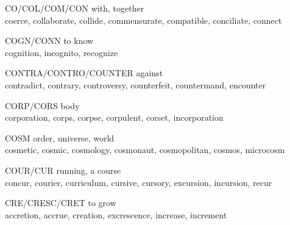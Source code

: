 \begin{flashcard}[Roots]{CO/COL/COM/CON}
with, together\\
\vspace{0.2in}
 coerce, collaborate, collide, commensurate, compatible, conciliate, connect\\
\end{flashcard}

\begin{flashcard}[Roots]{COGN/CONN}
 to know\\
\vspace{0.2in}
cognition, incognito, recognize\\
\end{flashcard}

\begin{flashcard}[Roots]{CONTRA/CONTRO/COUNTER}
 against\\
\vspace{0.2in}
contradict, contrary, controversy, counterfeit, countermand, encounter\\
\end{flashcard}

\begin{flashcard}[Roots]{CORP/CORS}
 body\\
\vspace{0.2in}
corporation, corps, corpse, corpulent, corset, incorporation\\
\end{flashcard}

\begin{flashcard}[Roots]{COSM}
order, universe, world\\
\vspace{0.2in}
cosmetic, cosmic, cosmology, cosmonaut, cosmopolitan, cosmos, microcosm\\
\end{flashcard}

\begin{flashcard}[Roots]{COUR/CUR}
running, a course\\
\vspace{0.2in}
concur, courier, curriculum, cursive, cursory, excursion, incursion, recur\\
\end{flashcard}

\begin{flashcard}[Roots]{CRE/CRESC/CRET}
to grow\\
\vspace{0.2in}
accretion, accrue, creation, excrescence, increase, increment\\
\end{flashcard}

